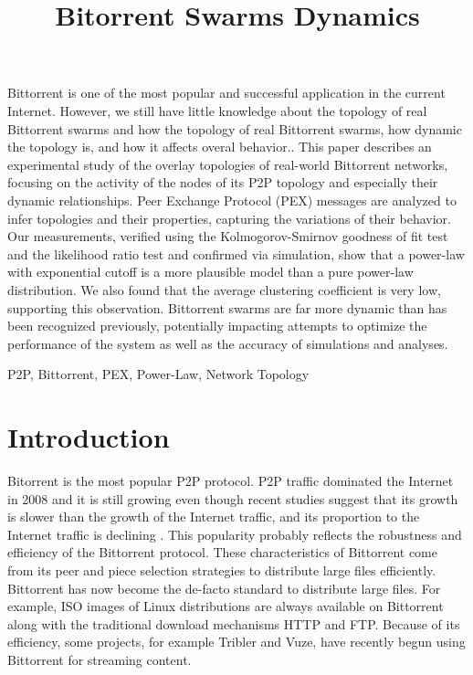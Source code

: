 \documentclass[paper]{ieice}
\title{Bitorrent Swarms Dynamics}
\begin{document}
\maketitle

\begin{summary}
Bittorrent is one of the most popular and successful application in the current Internet.
However, we still have little knowledge about the topology of real Bittorrent swarms and how the topology of real Bittorrent swarms, how dynamic the topology is, and how it affects overal behavior..
This paper describes an experimental study of the overlay topologies of real-world Bittorrent networks, focusing on the activity of the nodes of its P2P topology and especially their dynamic relationships. 
Peer Exchange Protocol (PEX) messages are analyzed to infer topologies and their properties, capturing the variations of their behavior.  
Our measurements, verified using the Kolmogorov-Smirnov goodness of fit test and the likelihood ratio test and confirmed via simulation, show that a power-law with exponential cutoff is a more plausible model than a pure power-law distribution.  
We also found that the average clustering coefficient is very low, supporting this observation.  
Bittorrent swarms are far more dynamic than has been recognized previously, potentially impacting attempts to optimize the performance of the system as well as the accuracy of simulations and analyses.
\end{summary}
\begin{keywords}
P2P, Bittorrent, PEX, Power-Law, Network Topology 
\end{keywords}


\section{Introduction}
Bitorrent is the most popular P2P protocol.
P2P traffic dominated the Internet in 2008 and it is still growing even though recent studies suggest that its growth is slower than the growth of the Internet traffic, and its proportion to the Internet traffic is declining \cite{labovitz2010internet} \cite{index2010forecast}.
This popularity probably reflects the robustness and efficiency of the Bittorrent protocol. 
These characteristics of Bittorrent come from its peer and piece selection strategies to distribute large files efficiently. 
Bittorrent has now become the de-facto standard to distribute large files. 
For example, ISO images of Linux distributions are always available on Bittorrent along with the traditional download mechanisms HTTP and FTP.  
Because of its efficiency, some projects, for example Tribler and Vuze, have recently begun using Bittorrent for streaming content.
\end{document}
